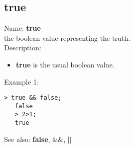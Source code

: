 \subsection{ true }
\noindent Name: \textbf{true}\\
the boolean value representing the truth.\\

\noindent Description: \begin{itemize}

\item \textbf{true} is the usual boolean value.
\end{itemize}
\noindent Example 1: 
\begin{center}\begin{minipage}{14.8cm}\begin{Verbatim}[frame=single]
   > true && false;
   false
   > 2>1;
   true
\end{Verbatim}
\end{minipage}\end{center}
See also: \textbf{false}, \textbf{$\&\&$}, \textbf{$||$}
